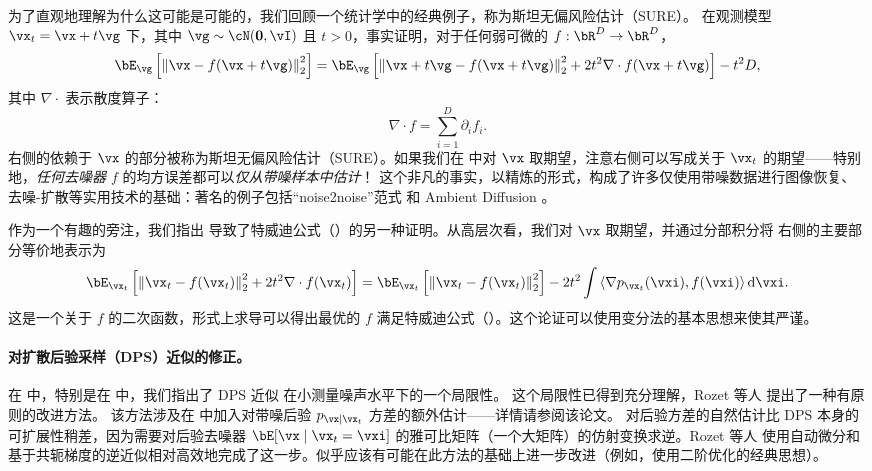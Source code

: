 \documentclass[../../book-main_zh.tex]{subfiles}
\begin{document}
为了直观地理解为什么这可能是可能的，我们回顾一个统计学中的经典例子，称为斯坦无偏风险估计（SURE）。
在观测模型 $\vx_t = \vx + t \vg$ 下，其中 $\vg \sim \cN(\Zero, \vI)$ 且 $t>0$，事实证明，对于任何弱可微的 $f : \bR^D \to \bR^D$，
\begin{equation}\label{eq:sure-risk}
  \bE_{\vg}\left[
    \norm*{\vx - f(\vx + t \vg)}_2^2
    \right]
  =
  \bE_{\vg}\left[
    \norm*{\vx+t\vg - f(\vx + t \vg)}_2^2
    + 2t^2 \nabla \cdot f(\vx + t\vg)
    \right]
  - t^2 D,
\end{equation}
其中 $\nabla \cdot$ 表示散度算子：
\begin{equation*}
	\nabla \cdot f = \sum_{i=1}^D \partial_i f_i.
\end{equation*}
 右侧的依赖于 $\vx$ 的部分被称为斯坦无偏风险估计（SURE）。如果我们在  中对 $\vx$ 取期望，注意右侧可以写成关于 $\vx_t$ 的期望——特别地，\textit{任何去噪器 $f$} 的均方误差都可以\textit{仅从带噪样本中估计}！
这个非凡的事实，以精炼的形式，构成了许多仅使用带噪数据进行图像恢复、去噪-扩散等实用技术的基础：著名的例子包括“noise2noise”范式 \cite{pmlr-v80-lehtinen18a} 和 Ambient Diffusion \cite{daras2023ambient}。

作为一个有趣的旁注，我们指出  导致了特威迪公式（）的另一种证明。从高层次看，我们对 $\vx$ 取期望，并通过分部积分将  右侧的主要部分等价地表示为
\begin{equation}
  \bE_{\vx_t}\left[
    \norm*{\vx_t - f(\vx_t)}_2^2
    + 2t^2 \nabla \cdot f(\vx_t)
    \right]
  =
  \bE_{\vx_t}\left[
    \norm*{\vx_t - f(\vx_t)}_2^2
    \right]
  - 2t^2 \int
  \ip*{\nabla p_{\vx_t}(\vxi)}{f(\vxi)}
  \odif \vxi.
\end{equation}
这是一个关于 $f$ 的二次函数，形式上求导可以得出最优的 $f$ 满足特威迪公式（）。这个论证可以使用变分法的基本思想来使其严谨。


\paragraph{对扩散后验采样（DPS）近似的修正。}
在  中，特别是在  中，我们指出了 DPS 近似  在小测量噪声水平下的一个局限性。
这个局限性已得到充分理解，Rozet 等人 \cite{rozet2024learning} 提出了一种有原则的改进方法。
该方法涉及在  中加入对带噪后验 $p_{\vx \mid \vx_t}$ 方差的额外估计——详情请参阅该论文。
对后验方差的自然估计比 DPS 本身的可扩展性稍差，因为需要对后验去噪器 $\bE[\vx \mid \vx_t=\vxi]$ 的雅可比矩阵（一个大矩阵）的仿射变换求逆。Rozet 等人 \cite{rozet2024learning} 使用自动微分和基于共轭梯度的逆近似相对高效地完成了这一步。似乎应该有可能在此方法的基础上进一步改进（例如，使用二阶优化的经典思想）。
\end{document}
